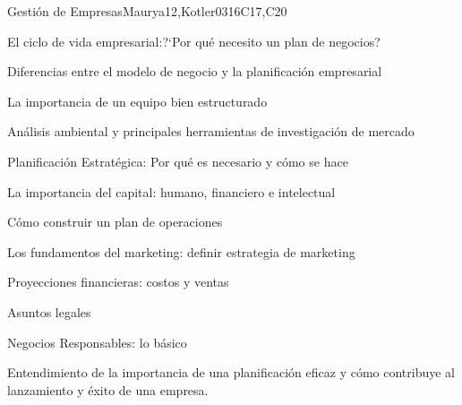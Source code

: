 \begin{syllabus}
\begin{unit}{Gestión de Empresas}{}{Maurya12,Kotler03}{16}{C17,C20}
\begin{topics}
      \item El ciclo de vida empresarial:?`Por qué necesito un plan de negocios?
      \item Diferencias entre el modelo de negocio y la planificación empresarial
      \item La importancia de un equipo bien estructurado
      \item Análisis ambiental y principales herramientas de investigación de mercado
      \item Planificación Estratégica: Por qué es necesario y cómo se hace
      \item La importancia del capital: humano, financiero e intelectual
      \item Cómo construir un plan de operaciones
      \item Los fundamentos del marketing: definir estrategia de marketing
      \item Proyecciones financieras: costos y ventas
      \item Asuntos legales
      \item Negocios Responsables: lo básico
\end{topics}

\begin{learningoutcomes}
   \item Entendimiento de la importancia de una planificación eficaz y cómo contribuye al lanzamiento y éxito de una empresa.
\end{learningoutcomes}
\end{unit}



\begin{coursebibliography}
\end{coursebibliography}

\end{syllabus}

